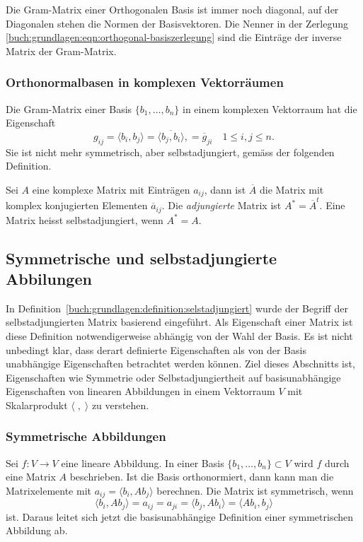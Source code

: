 Die Gram-Matrix einer Orthogonalen Basis ist immer noch diagonal,
auf der Diagonalen stehen die Normen der Basisvektoren.
Die Nenner in der Zerlegung
\eqref{buch:grundlagen:eqn:orthogonal-basiszerlegung}
sind die Einträge der inverse Matrix der Gram-Matrix.

\subsubsection{Orthonormalbasen in komplexen Vektorräumen}
Die Gram-Matrix einer Basis $\{b_1,\dots,b_n\}$ in einem komplexen
Vektorraum hat die Eigenschaft
\[
g_{ij}
=
\langle b_i,b_j\rangle
=
\overline{\langle b_j,b_i\rangle},
=
\overline{g}_{ji}
\quad 1\le i,j\le n.
\]
Sie ist nicht mehr symmetrisch, aber selbstadjungiert, gemäss 
der folgenden Definition.

\begin{definition}
\label{buch:grundlagen:definition:selstadjungiert}
Sei $A$ eine komplexe Matrix mit Einträgen $a_{ij}$, dann ist
$\overline{A}$ die Matrix mit komplex konjugierten Elementen
$\overline{a}_{ij}$.
Die {\em adjungierte} Matrix ist $A^*=\overline{A}^t$.
Eine Matrix heisst selbstadjungiert, wenn $A^*=A$.
\end{definition}

\subsection{Symmetrische und selbstadjungierte Abbilungen
\label{buch:subsection:symmetrisch-und-selbstadjungiert}}
In Definition~\ref{buch:grundlagen:definition:selstadjungiert}
wurde der Begriff der selbstadjungierten Matrix basierend
eingeführt.
Als Eigenschaft einer Matrix ist diese Definition notwendigerweise
abhängig von der Wahl der Basis.
Es ist nicht unbedingt klar, dass derart definierte Eigenschaften
als von der Basis unabhängige Eigenschaften betrachtet werden können.
Ziel dieses Abschnitts ist, Eigenschaften wie Symmetrie oder
Selbstadjungiertheit auf basisunabhängige Eigenschaften von
linearen Abbildungen in einem Vektorraum $V$ mit Skalarprodukt
$\langle\;,\;\rangle$ zu verstehen.

\subsubsection{Symmetrische Abbildungen}
Sei $f\colon V\to V$ eine lineare Abbildung.
In einer Basis $\{b_1,\dots,b_n\}\subset V$ wird $f$ durch eine
Matrix $A$ beschrieben.
Ist die Basis orthonormiert, dann kann man die Matrixelemente 
mit $a_{ij}=\langle b_i,Ab_j\rangle$ berechnen.
Die Matrix ist symmetrisch, wenn 
\[
\langle b_i,Ab_j\rangle
=
a_{ij}
= 
a_{ji}
=
\langle b_j,Ab_i \rangle
=
\langle Ab_i,b_j \rangle
\]
ist.
Daraus leitet sich jetzt die basisunabhängige Definition einer
symmetrischen Abbildung ab.

